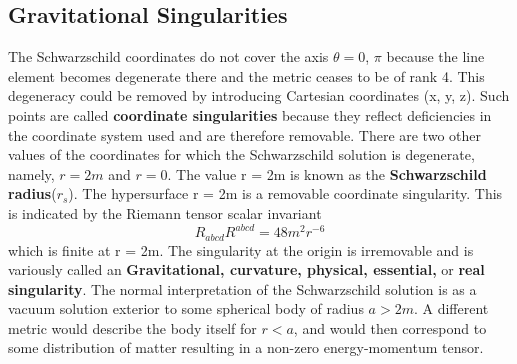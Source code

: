 \documentclass[12pt,a4paper]{article}
\numberwithin{table}{section}
\numberwithin{figure}{section}
\numberwithin{equation}{section}
\theoremstyle{remark}
\theoremstyle{definition}
\begin{document}
\subsection{Gravitational Singularities}
The Schwarzschild coordinates do not cover the axis $\theta= 0$, 
$\pi$ because the line element becomes degenerate there and the metric ceases to be of rank 4. This degeneracy could be removed by introducing Cartesian 
coordinates (x, y, z). Such points are called \textbf{coordinate singularities} because they reflect  deficiencies in the coordinate system used and are therefore removable. There are two other values of the coordinates for which the Schwarzschild solution is degenerate, namely, $r=2m$ and $r = 0$. The value r = 2m is known as the \textbf{Schwarzschild radius}($r_s$). The hypersurface r = 2m is a removable coordinate singularity. This is indicated by the Riemann tensor scalar invariant
$$R_{abcd}R^{abcd}=48m^2r^{-6}$$
which is finite at r = 2m. The singularity at the origin is irremovable and is variously called an \textbf{Gravitational, curvature, physical, essential,} or \textbf{real singularity}. The normal interpretation of the Schwarzschild solution is as a vacuum solution exterior to some spherical body of radius $a > 2m$. A different metric would describe the body itself for $r < a$, and would then correspond to some distribution of matter resulting in a non-zero energy-momentum tensor.
\end{document}
